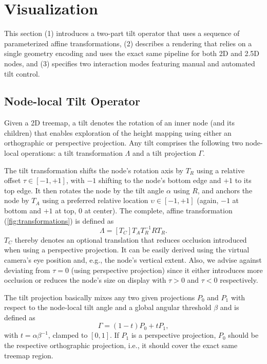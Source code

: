 
\section{Visualization}
\label{sec:visualization}
\noindent
This section (1) introduces a two-part tilt operator that uses a sequence of parameterized affine transformations, (2) describes a rendering that relies on a single geometry encoding and uses the exact same pipeline for both 2D and 2.5D nodes, and (3) specifies two interaction modes featuring manual and automated tilt control.

\subsection*{Node-local Tilt Operator}
\noindent
Given a 2D treemap, a tilt denotes the rotation of an inner node (and its children) that enables exploration of the height mapping using either an orthographic or perspective projection.
Any tilt comprises the following two node-local operations: a tilt transformation $\Lambda$ and a tilt projection $\Gamma$.

The tilt transformation shifts the node's rotation axis by $T_R$ using a relative offset $\tau\in\left[-1,+1\right]$, with $-1$ shifting to the node's bottom edge and $+1$ to its top edge.
It then rotates the node by the tilt angle $\alpha$ using $R$, and anchors the node by $T_A$ using a preferred relative location $\upsilon\in\left[-1,+1\right]$ (again, $-1$ at bottom and $+1$ at top, $0$ at center).
The complete, affine transformation (\autoref{fig:transformations}) is defined as
\begin{equation}
    \Lambda = \left[T_C\right] T_A T^{-1}_R R T_R.
\end{equation}
$T_C$ thereby denotes an optional translation that reduces occlusion introduced when using a perspective projection.
It can be easily derived using the virtual camera's eye position and, e.g., the node's vertical extent.
Also, we advise against deviating from $\tau=0$ (using perspective projection) since it either introduces more occlusion or reduces the node's size on display with $\tau>0$ and $\tau<0$ respectively.

The tilt projection basically mixes any two given projections $P_0$ and $P_1$ with respect to the node-local tilt angle and a global angular threshold $\beta$ and is defined as
\begin{equation}
    \Gamma = \left(1 - t\right) P_0 + t P_1,
\end{equation}
with $t = \alpha\beta^{-1}$, clamped to $\left[0,1\right]$.
If $P_1$ is a perspective projection, $P_0$ should be the respective orthographic projection, i.e., it should cover the exact same treemap region.

